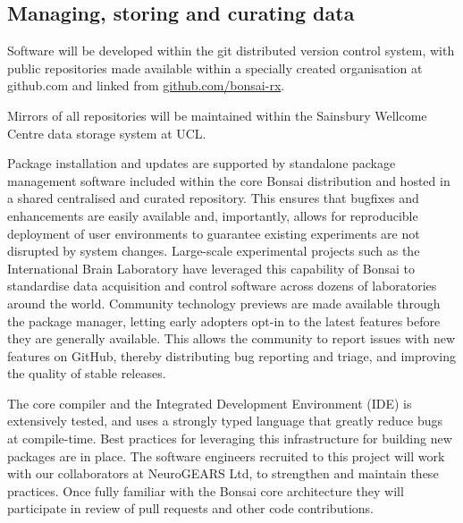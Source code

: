 \documentclass[a4paper,11pt]{article}
\begin{document}
\subsection{Managing, storing and curating data}


Software will be developed within the git distributed version control
system, with public repositories made available within a specially
created organisation at github.com and linked from \url{github.com/bonsai-rx}.

Mirrors of all repositories will be maintained within the Sainsbury Wellcome Centre data storage system at UCL. 

Package installation and updates are supported by standalone package management
software included within the core Bonsai distribution and hosted in a shared
centralised and curated repository. This ensures that bugfixes and enhancements
are easily available and, importantly, allows for reproducible deployment of
user environments to guarantee existing experiments are not disrupted by system
changes.
%
Large-scale experimental projects such as the International Brain Laboratory
have leveraged this capability of Bonsai to standardise data acquisition and
control software across dozens of laboratories around the world.
%
Community technology previews are made available through the package manager,
letting early adopters opt-in to the latest features before they are generally
available. This allows the community to report issues with new features on
GitHub, thereby distributing bug reporting and triage, and improving the
quality of stable releases.

The core compiler and the Integrated Development Environment (IDE) is extensively tested, and uses a strongly typed language
that greatly reduce bugs at compile-time. Best practices for leveraging this
infrastructure for building new packages are in place. The software engineers
recruited to this project will work with our collaborators at NeuroGEARS Ltd,
to strengthen and maintain these practices. Once fully familiar with the Bonsai
core architecture they will participate in review of pull requests and other
code contributions.


\end{document}
